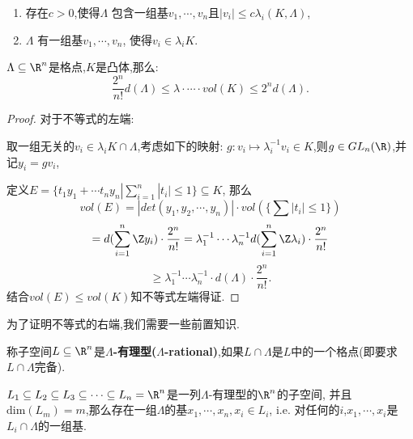 \begin{remark}
    \begin{enumerate}
        \item 存在$c>0$,使得$\Lambda$ 包含一组基$v_1, \cdots, v_n$且$|v_i| \leq c\lambda_i(K,\Lambda)$,
        \item $\Lambda$ 有一组基$v_1, \cdots, v_n$, 使得$v_i\in \lambda_i K$.
    \end{enumerate}
\end{remark}

\begin{theorem}[Minkowski第二凸体定理]
$\Lambda \subseteq \R^n$是格点,$K$是凸体,那么:
$$\frac{2^n}{n!} d(\Lambda) \leq \lambda \cdot \cdots \cdot vol(K) \leq 2^n d(\Lambda).$$
\end{theorem}

\begin{proof}
    对于不等式的左端:

    取一组无关的$v_i \in \lambda_i K \cap \Lambda$,考虑如下的映射:
    $g:v_i \mapsto \lambda_i^{-1} v_i \in K$,则$g\in GL_n(\R)$,并记$y_i = gv_i$,

    定义$\displaystyle E = \{t_1y_1 + \cdots t_ny_n|\sum_{i=1}^n|t_i| \leq 1\}\subseteq K$,
    那么
    $$vol(E) = |det(y_1, y_2, \cdots, y_n)| \cdot vol(\{\sum |t_i| \leq 1\})$$
    $$ = d(\sum_{i=1}^n \Z y_i) \cdot \frac{2^n}{n!} = \lambda_1 ^{-1} \cdots \lambda_n^{-1}  d(\sum_{i=1}^n\Z \lambda_i)\cdot \frac{2^n}{n!}$$
    $$\geq \lambda_1 ^{-1} \cdots \lambda_n^{-1} \cdot d(\Lambda) \cdot \frac{2^n}{n!}.$$
    结合$vol(E) \leq vol(K)$知不等式左端得证.
\end{proof}

为了证明不等式的右端,我们需要一些前置知识.

\begin{definition}
    称子空间$L\subseteq \R^n$是\textbf{$\Lambda$-有理型($\Lambda$-rational)},如果$L\cap \Lambda$是$L$中的一个格点(即要求$L\cap\Lambda$完备).
\end{definition}
\begin{lemma}
    $L_1 \subseteq L_2 \subseteq L_3 \subseteq \cdots \subseteq L_n = \R^n$是一列$\Lambda$-有理型的$\R^n$的子空间,
    并且$\mathrm{dim}(L_m) = m$,那么存在一组$\Lambda$的基$x_1, \cdots, x_n,x_i \in L_i$,  i.e. 对任何的$i$,$x_1,\cdots, x_i$是$L_i\cap \Lambda$的一组基.
\end{lemma}

